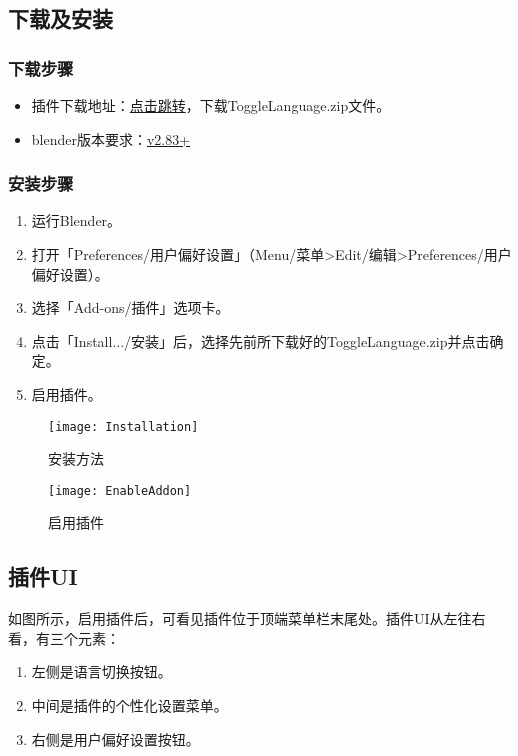 \documentclass{../../PublicResources/DocClass}
\begin{document}
\subsection{下载及安装}
\subsubsection{下载步骤}
\begin{itemize}
    \item 插件下载地址：\href{https://github.com/Mister-Kin/ToggleLanguage/releases/latest}{点击跳转}，下载ToggleLanguage.zip文件。
    \item blender版本要求：\href{https://www.blender.org/download/}{v2.83+}
\end{itemize}

\subsubsection{安装步骤}
\begin{enumerate}
    \item 运行Blender。
    \item 打开「Preferences/用户偏好设置」（Menu/菜单>Edit/编辑>Preferences/用户偏好设置）。
    \item 选择「Add-ons/插件」选项卡。
    \item 点击「Install.../安装」后，选择先前所下载好的ToggleLanguage.zip并点击确定。
    \item 启用插件。
\end{enumerate}

\begin{figure}[h!]
    \begin{minipage}[t]{0.47\textwidth}
        \texttt{[image: Installation]}
        \caption{安装方法}
    \end{minipage}
    \quad
    \begin{minipage}[t]{0.47\textwidth}
        \texttt{[image: EnableAddon]}
        \caption{启用插件}
        \label{启用插件}
    \end{minipage}
\end{figure}

\subsection{插件UI}
\label{插件UI小节}
如图所示，启用插件后，可看见插件位于顶端菜单栏末尾处。插件UI从左往右看，有三个元素：
\begin{enumerate}
    \item 左侧是语言切换按钮。
    \item 中间是插件的个性化设置菜单。
    \item 右侧是用户偏好设置按钮。
\end{enumerate}
\end{document}
